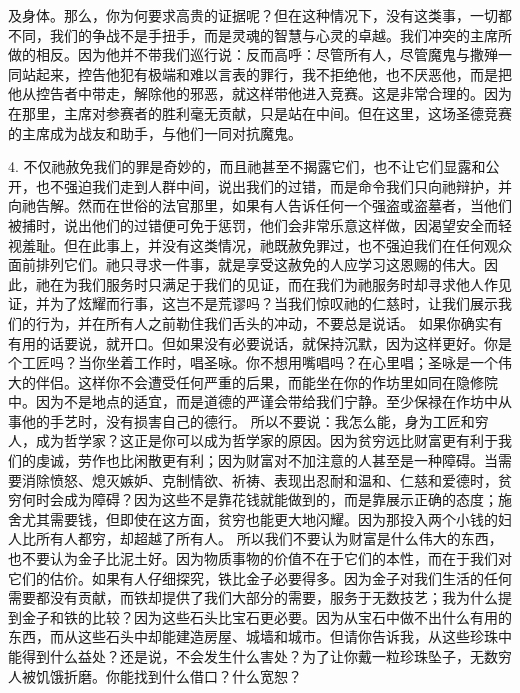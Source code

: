 及身体。那么，你为何要求高贵的证据呢？但在这种情况下，没有这类事，一切都不同，我们的争战不是手扭手，而是灵魂的智慧与心灵的卓越。我们冲突的主席所做的相反。因为他并不带我们巡行说：反而高呼：尽管所有人，尽管魔鬼与撒殚一同站起来，控告他犯有极端和难以言表的罪行，我不拒绝他，也不厌恶他，而是把他从控告者中带走，解除他的邪恶，就这样带他进入竞赛。这是非常合理的。因为在那里，主席对参赛者的胜利毫无贡献，只是站在中间。但在这里，这场圣德竞赛的主席成为战友和助手，与他们一同对抗魔鬼。\par

4. 不仅祂赦免我们的罪是奇妙的，而且祂甚至不揭露它们，也不让它们显露和公开，也不强迫我们走到人群中间，说出我们的过错，而是命令我们只向祂辩护，并向祂告解。然而在世俗的法官那里，如果有人告诉任何一个强盗或盗墓者，当他们被捕时，说出他们的过错便可免于惩罚，他们会非常乐意这样做，因渴望安全而轻视羞耻。但在此事上，并没有这类情况，祂既赦免罪过，也不强迫我们在任何观众面前排列它们。祂只寻求一件事，就是享受这赦免的人应学习这恩赐的伟大。因此，祂在为我们服务时只满足于我们的见证，而在我们为祂服务时却寻求他人作见证，并为了炫耀而行事，这岂不是荒谬吗？当我们惊叹祂的仁慈时，让我们展示我们的行为，并在所有人之前勒住我们舌头的冲动，不要总是说话。 如果你确实有有用的话要说，就开口。但如果没有必要说话，就保持沉默，因为这样更好。你是个工匠吗？当你坐着工作时，唱圣咏。你不想用嘴唱吗？在心里唱；圣咏是一个伟大的伴侣。这样你不会遭受任何严重的后果，而能坐在你的作坊里如同在隐修院中。因为不是地点的适宜，而是道德的严谨会带给我们宁静。至少保禄在作坊中从事他的手艺时，没有损害自己的德行。 所以不要说：我怎么能，身为工匠和穷人，成为哲学家？这正是你可以成为哲学家的原因。因为贫穷远比财富更有利于我们的虔诚，劳作也比闲散更有利；因为财富对不加注意的人甚至是一种障碍。当需要消除愤怒、熄灭嫉妒、克制情欲、祈祷、表现出忍耐和温和、仁慈和爱德时，贫穷何时会成为障碍？因为这些不是靠花钱就能做到的，而是靠展示正确的态度；施舍尤其需要钱，但即使在这方面，贫穷也能更大地闪耀。因为那投入两个小钱的妇人比所有人都穷，却超越了所有人。 所以我们不要认为财富是什么伟大的东西，也不要认为金子比泥土好。因为物质事物的价值不在于它们的本性，而在于我们对它们的估价。如果有人仔细探究，铁比金子必要得多。因为金子对我们生活的任何需要都没有贡献，而铁却提供了我们大部分的需要，服务于无数技艺；我为什么提到金子和铁的比较？因为这些石头比宝石更必要。因为从宝石中做不出什么有用的东西，而从这些石头中却能建造房屋、城墙和城市。但请你告诉我，从这些珍珠中能得到什么益处？还是说，不会发生什么害处？为了让你戴一粒珍珠坠子，无数穷人被饥饿折磨。你能找到什么借口？什么宽恕？\par

